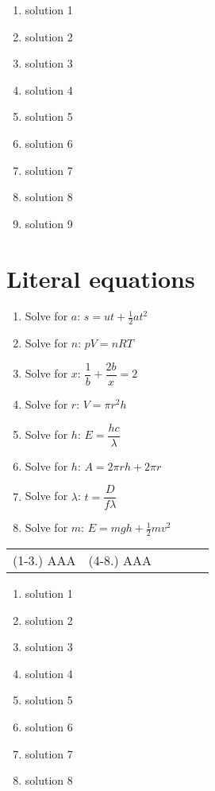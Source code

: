  \begin{solutions}{}{
\begin{enumerate}[itemsep=5pt, label=\textbf{\arabic*}. ] 


\item solution 1
\item solution 2
\item solution 3
\item solution 4
\item solution 5
\item solution 6
\item solution 7
\item solution 8
\item solution 9

\end{enumerate}}
\end{solutions}


\section{Literal equations}
\begin{exercises}{}
{
\begin{enumerate}[itemsep=5pt, label=\textbf{\arabic*}. ] 
\item Solve for $a$: $s=ut+\frac{1}{2}at^{2}$
\item Solve for $n$: $pV=nRT$ 
\item Solve for $x$: $\dfrac{1}{b}+\dfrac{2b}{x}=2$
\item Solve for $r$: $V = \pi r^{2} h$
\item Solve for $h$: $E=\dfrac{hc}{\lambda}$
\item Solve for $h$: $A=2\pi rh + 2 \pi r$
\item Solve for $\lambda$: $t=\dfrac{D}{f \lambda}$
\item Solve for $m$: $E=mgh + \frac{1}{2}mv^{2}$
\end{enumerate}
\practiceinfo
\par 
\par \begin{tabular}[h]{cccccc}
(1-3.) AAA  &   (4-8.) AAA \end{tabular}
}
\end{exercises}


 \begin{solutions}{}{
\begin{enumerate}[itemsep=5pt, label=\textbf{\arabic*}. ] 


\item solution 1
\item solution 2
\item solution 3
\item solution 4
\item solution 5
\item solution 6
\item solution 7
\item solution 8

\end{enumerate}}
\end{solutions}


